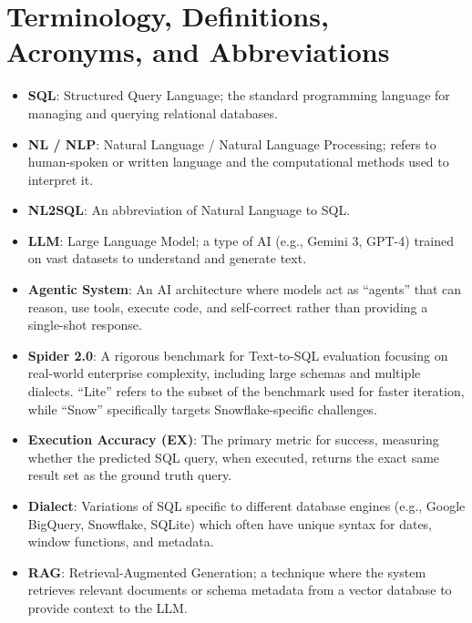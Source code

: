 \section{Terminology, Definitions, Acronyms, and Abbreviations}
\begin{itemize}

\item \textbf{SQL}: Structured Query Language; the standard programming language for managing and querying relational databases.
\item \textbf{NL / NLP}: Natural Language / Natural Language Processing; refers to human-spoken or written language and the computational methods used to interpret it.
\item \textbf{NL2SQL}: An abbreviation of Natural Language to SQL.
\item \textbf{LLM}: Large Language Model; a type of AI (e.g., Gemini 3, GPT-4) trained on vast datasets to understand and generate text.
\item \textbf{Agentic System}: An AI architecture where models act as “agents” that can reason, use tools, execute code, and self-correct rather than providing a single-shot response.
\item \textbf{Spider 2.0}: A rigorous benchmark for Text-to-SQL evaluation focusing on real-world enterprise complexity, including large schemas and multiple dialects. ``Lite'' refers to the subset of the benchmark used for faster iteration, while ``Snow'' specifically targets Snowflake-specific challenges.
\item \textbf{Execution Accuracy (EX)}: The primary metric for success, measuring whether the predicted SQL query, when executed, returns the exact same result set as the ground truth query.
\item \textbf{Dialect}: Variations of SQL specific to different database engines (e.g., Google BigQuery, Snowflake, SQLite) which often have unique syntax for dates, window functions, and metadata.
\item \textbf{RAG}: Retrieval-Augmented Generation; a technique where the system retrieves relevant documents or schema metadata from a vector database to provide context to the LLM.

\end{itemize}
